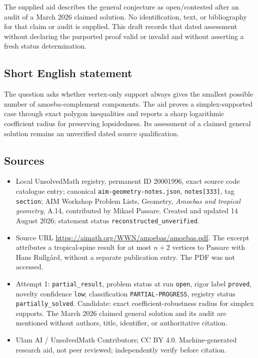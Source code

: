\documentclass[11pt]{article}
\begin{document}
The supplied aid describes the general conjecture as open/contested after an audit of a March 2026 claimed solution. No identification, text, or bibliography for that claim or audit is supplied. This draft records that dated assessment without declaring the purported proof valid or invalid and without asserting a fresh status determination.
\subsection{Short English statement}
The question asks whether vertex-only support always gives the smallest possible number of amoeba-complement components. The aid proves a simplex-supported case through exact polygon inequalities and reports a sharp logarithmic coefficient radius for preserving lopsidedness. Its assessment of a claimed general solution remains an unverified dated source qualification.
\subsection{Sources}
\begin{itemize}
\item Local UnsolvedMath registry, permanent ID 20001996, exact source code catalogue entry; canonical \texttt{aim-geometry-notes.json}, \texttt{notes[333]}, tag \texttt{section}; AIM Workshop Problem Lists, Geometry, \emph{Amoebas and tropical geometry}, A.14, contributed by Mikael Passare. Created and updated 14 August 2026; statement status \texttt{reconstructed\_unverified}.
\item Source URL \url{https://aimath.org/WWN/amoebas/amoebas.pdf}. The excerpt attributes a tropical-spine result for at most \(n+2\) vertices to Passare with Hans Rullgård, without a separate publication entry. The PDF was not accessed.
\item Attempt 1: \texttt{partial\_result}, problem status at run \texttt{open}, rigor label \texttt{proved}, novelty confidence \texttt{low}; classification \texttt{PARTIAL-PROGRESS}, registry status \texttt{partially\_solved}. Candidate: exact coefficient-robustness radius for simplex supports. The March 2026 claimed general solution and its audit are mentioned without authors, title, identifier, or authoritative citation.
\item Ulam AI / UnsolvedMath Contributors; CC BY 4.0. Machine-generated research aid, not peer reviewed; independently verify before citation.
\end{itemize}
\end{document}
